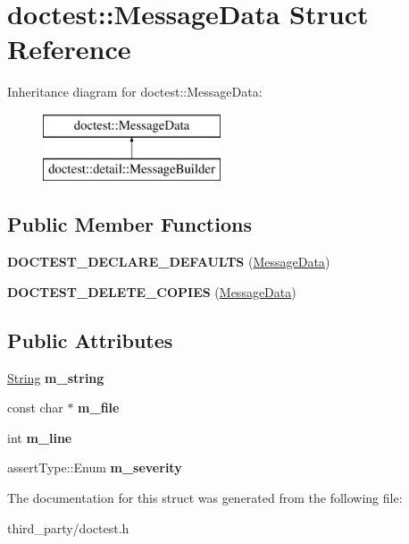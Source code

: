 \hypertarget{structdoctest_1_1_message_data}{}\section{doctest\+::Message\+Data Struct Reference}
\label{structdoctest_1_1_message_data}
Inheritance diagram for doctest\+::Message\+Data\+:\begin{figure}[H]
\begin{center}
\leavevmode
\includegraphics[height=2.000000cm]{structdoctest_1_1_message_data}
\end{center}
\end{figure}
\subsection*{Public Member Functions}
\begin{DoxyCompactItemize}
\item 
\mbox{\label{structdoctest_1_1_message_data_ac10833dc7dcbdbba602aa0534925e4c0}} 
{\bfseries D\+O\+C\+T\+E\+S\+T\+\_\+\+D\+E\+C\+L\+A\+R\+E\+\_\+\+D\+E\+F\+A\+U\+L\+TS} (\mbox{\hyperlink{structdoctest_1_1_message_data}{Message\+Data}})
\item 
\mbox{\label{structdoctest_1_1_message_data_a293086b2aa60d95a43385ff67ac43bae}} 
{\bfseries D\+O\+C\+T\+E\+S\+T\+\_\+\+D\+E\+L\+E\+T\+E\+\_\+\+C\+O\+P\+I\+ES} (\mbox{\hyperlink{structdoctest_1_1_message_data}{Message\+Data}})
\end{DoxyCompactItemize}
\subsection*{Public Attributes}
\begin{DoxyCompactItemize}
\item 
\mbox{\label{structdoctest_1_1_message_data_a0ef5cfd7a399ee475d6357b6dcddfe53}} 
\mbox{\hyperlink{classdoctest_1_1_string}{String}} {\bfseries m\+\_\+string}
\item 
\mbox{\label{structdoctest_1_1_message_data_acd1e6a5c4f03ed6e098cdab5956a3e17}} 
const char $\ast$ {\bfseries m\+\_\+file}
\item 
\mbox{\label{structdoctest_1_1_message_data_a7c1cf03250a68db5befbba63b3824d93}} 
int {\bfseries m\+\_\+line}
\item 
\mbox{\label{structdoctest_1_1_message_data_a24e0a3f475609ce8e02cecc4cb0d3b48}} 
assert\+Type\+::\+Enum {\bfseries m\+\_\+severity}
\end{DoxyCompactItemize}


The documentation for this struct was generated from the following file\+:\begin{DoxyCompactItemize}
\item 
third\+\_\+party/doctest.\+h\end{DoxyCompactItemize}
